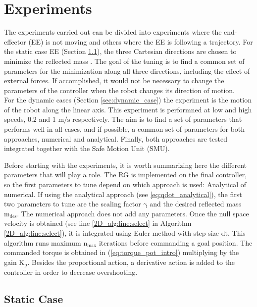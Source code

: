 \chapter{Experiments}
\label{ch:experiments}


The experiments carried out can be divided into experiments where the end-effector (EE) is not moving  and others where the EE is following a trajectory. 
For the static case EE (Section \ref{sec:static_case}), the three Cartesian directions are chosen to minimize the reflected mass . The goal of the tuning is to find a common set of parameters for the minimization along all three directions, including the effect of external forces. If accomplished, it would not be necessary to change the parameters of the controller when the robot changes its direction of motion.\\
%
For the dynamic cases (Section \ref{sec:dynamic_case}) the  experiment is the motion of the robot along the linear axis. This experiment is performned at low and high speeds, 0.2 and 1 $\mathrm{m/s}$ respectively. 
The aim is to find a set of parameters that performs well in all cases, and if possible, a common set of parameters for both approaches, numerical and analytical.
Finally, both approaches are tested integrated together with the Safe Motion Unit (SMU). 

Before starting with the experiments, it is worth summarizing here the different parameters that will play a role. 
The RG is implemented on the final controller, so the first parameters to tune depend on which approach is used: Analytical of numerical. If using the analytical approach (see \ref{eq:qdot_analytical}), the first two parameters to tune are the scaling factor $\mathrm{\gamma}$ and the desired reflected mass $\mathrm{m_{des}}$. The numerical approach does not add any parameters. Once the null space velocity is obtained (see line \ref{2D_alg:line:select} in Algorithm \ref{2D_alg:line:select}), it is integrated using Euler method with step size $\mathrm{dt}$. This algorithm runs maximum $\mathrm{n_{max}}$ iterations before commanding a goal position. The commanded torque is obtained in (\ref{eq:torque_pot_intro}) multiplying by the gain $\mathrm{K_p}$. Besides the proportional action, a derivative action is added to the controller in order to decrease overshooting.



\section{Static Case} 
\label{sec:static_case}







